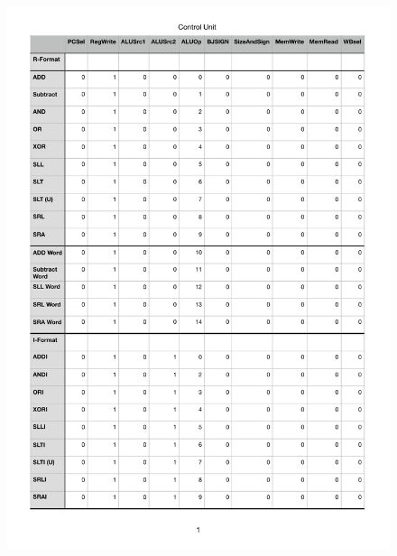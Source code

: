     \begin{figure}[h!]
        \vspace{-3cm}
        
        \hspace*{-2cm}
        \includegraphics[scale=1]{pictures/Controltable1.pdf}
    \end{figure} 

